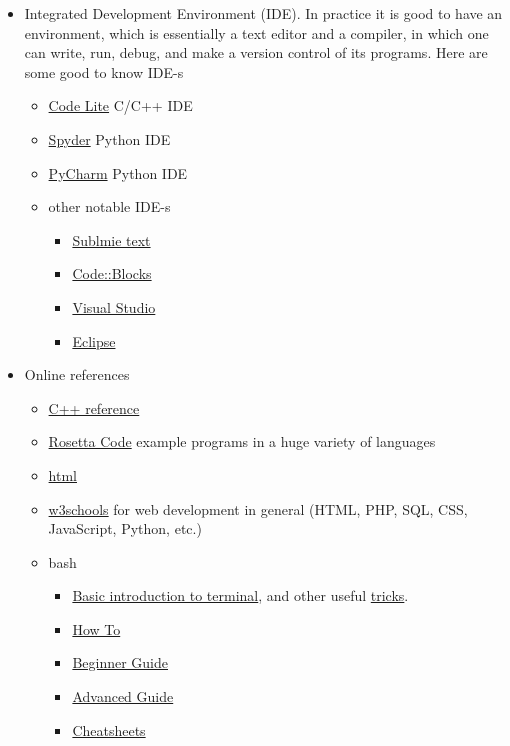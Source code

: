 \documentclass{article}
\begin{document}
\begin{itemize}
    
    \item Integrated Development Environment (IDE). In practice it is good to have an environment, which is essentially a text editor and a compiler, in which one can write, run, debug, and make a version control of its programs. Here are some good to know IDE-s
    \begin{itemize}
        \item \href{https://codelite.org/}{Code Lite} C/C++ IDE
        \item \href{https://www.spyder-ide.org/}{Spyder} Python IDE
        \item \href{https://www.jetbrains.com/pycharm/}{PyCharm} Python IDE
        \item other notable IDE-s
        \begin{itemize}
            \item \href{https://www.sublimetext.com/}{Sublmie text}
            \item \href{https://www.codeblocks.org/}{Code::Blocks}
            \item \href{https://visualstudio.microsoft.com/}{Visual Studio}
            \item \href{https://www.eclipse.org/ide/}{Eclipse}
        \end{itemize}
    \end{itemize}
    
    \item Online references
    \begin{itemize}
        \item \href{http://www.cplusplus.com/doc/tutorial/}{C++ reference}
        \item \href{http://rosettacode.org/wiki/Rosetta_Code}{Rosetta Code} example programs in a huge variety of languages
        \item \href{https://www.w3schools.com/html/}{html}
        \item \href{https://www.w3schools.com/}{w3schools} for web development in general (HTML, PHP, SQL, CSS, JavaScript, Python, etc.)
    
        \item bash
        \begin{itemize}
            \item \href{https://www.howtogeek.com/140679/beginner-geek-how-to-start-using-the-linux-terminal/}{Basic introduction to terminal}, and other useful \href{https://itsfoss.com/linux-command-tricks/}{tricks}.
            \item \href{https://tldp.org/HOWTO/Bash-Prog-Intro-HOWTO.html}{How To}
            \item \href{https://www.tldp.org/LDP/Bash-Beginners-Guide/html/}{Beginner Guide}
            \item \href{https://tldp.org/LDP/abs/html/}{Advanced Guide}
            \item \href{https://devhints.io/bash}{Cheatsheets} 
        \end{itemize}
        

\end{itemize}
\end{itemize}
\end{document}
